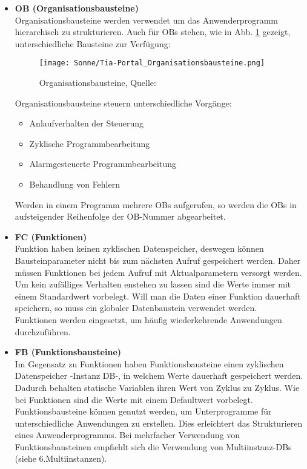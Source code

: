     \begin{itemize}
        \item[1.] \textbf{OB (Organisationsbausteine)} \\
            Organisationsbausteine werden verwendet um das Anwenderprogramm hierarchisch zu strukturieren. Auch für OBs stehen, wie in Abb. \ref{Organisationsbausteine} gezeigt, unterschiedliche Bausteine zur Verfügung:
            \begin{figure}[h]
                \texttt{[image: Sonne/Tia-Portal\_Organisationsbausteine.png]}
                \caption{Organisationsbausteine, Quelle: \cite{Programmierleitfaden_für_S7-1500}}
                \label{Organisationsbausteine}
            \end{figure}

            Organisationsbausteine steuern unterschiedliche Vorgänge:
            \begin{itemize}
                \item Anlaufverhalten der Steuerung
                \item Zyklische Programmbearbeitung
                \item Alarmgesteuerte Programmbearbeitung
                \item Behandlung von Fehlern
            \end{itemize}
            Werden in einem Programm mehrere OBs aufgerufen, so werden die OBs in aufsteigender Reihenfolge der OB-Nummer abgearbeitet. 

        \item[2.] \textbf{FC (Funktionen)} \\
            Funktion haben keinen zyklischen Datenspeicher, deswegen können Bausteinparameter nicht bis zum nächsten Aufruf gespeichert werden. Daher müssen Funktionen bei jedem Aufruf mit Aktualparametern versorgt werden. Um kein zufälliges Verhalten enstehen zu lassen sind die Werte immer mit einem Standardwert vorbelegt. Will man die Daten einer Funktion dauerhaft speichern, so muss ein globaler Datenbaustein verwendet werden.\\
            Funktionen werden eingesetzt, um häufig wiederkehrende Anwendungen durchzuführen.
            
        \item[3.] \textbf{FB (Funktionsbausteine)} \\
            Im Gegensatz zu Funktionen haben Funktionsbausteine einen zyklischen Datenspeicher -Instanz DB-, in welchem Werte dauerhaft gespeichert werden. Dadurch behalten statische Variablen ihren Wert von Zyklus zu Zyklus. Wie bei Funktionen sind die Werte mit einem Defaultwert vorbelegt.\\
            Funktionsbausteine können genutzt werden, um Unterprogramme für unterschiedliche Anwendungen zu erstellen. Dies erleichtert das Strukturieren eines Anwenderprogramms. Bei mehrfacher Verwendung von Funktionsbausteinen empfiehlt sich die Verwendung von Multiinstanz-DBs (siehe 6.Multiinstanzen).
        

\end{itemize}
